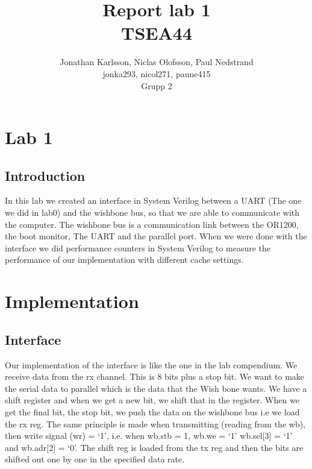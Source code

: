\documentclass[a4paper]{article}
\author{Jonathan Karlsson, Niclas Olofsson, Paul Nedstrand\\jonka293, nicol271, paune415\\Grupp 2}
\title{Report lab 1\\ \vspace{2 mm} {\large TSEA44}}
\begin{document}
\maketitle

\newpage

\tableofcontents

\newpage
\section{Lab 1}
\subsection{Introduction}


In this lab we created an interface in System Verilog between a UART (The one we did in lab0) and the wishbone bus, so that we are able to communicate with the computer. The wishbone bus is a communication link between the OR1200, the boot monitor, The UART and the parallel port. 
When we were done with the interface we did performance counters in System Verilog to measure the performance of our implementation with different cache settings.


\section{Implementation}

\subsection{Interface}

Our implementation of the interface is like the one in the lab compendium. We receive data from the rx channel. This is 8 bits plus a stop bit. We want to make the serial data to parallel which is the data that the Wish bone wants. We have a shift register and when we get a new bit, we shift that in the register. When we get the final bit, the stop bit, we push the data on the wishbone bus i.e we load the rx reg. 
The same principle is made when transmitting (reading from the wb), then write signal (wr) = ‘1’,  i.e. when wb.stb = 1, wb.we  = ‘1’ wb.sel[3] = ‘1’ and wb.adr[2] = ‘0’. The shift reg is loaded from the tx reg and then the bits are shifted out one by one in the specified data rate.
\end{document}
